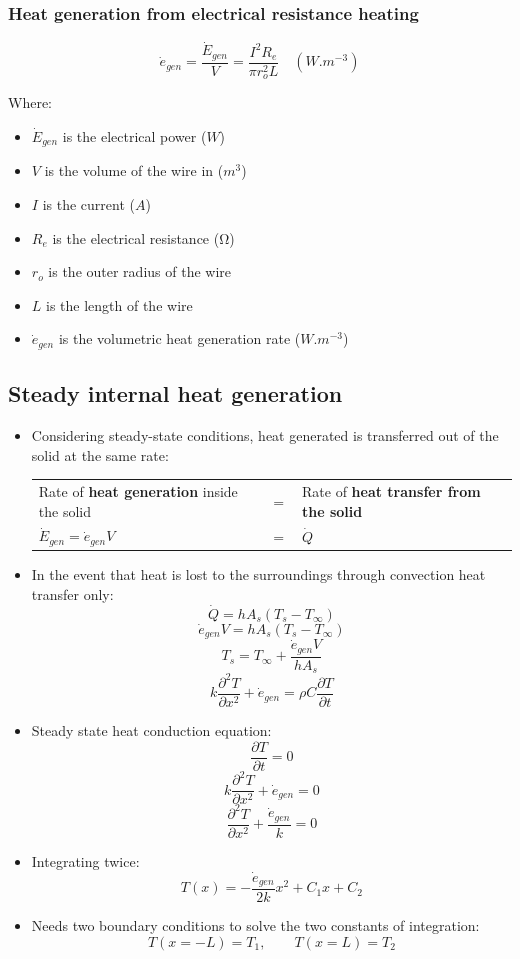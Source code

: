 \documentclass[11pt]{article}
\begin{document}
 \newpage
\subsubsection{Heat generation from electrical resistance heating}
\label{sec:org05d5d3d}
\[\dot{e}_{gen} = \frac{\dot{E}_{gen}}{V} = \frac{I^2 R_e}{\pi r_o^2 L} \quad (\unit{W.m^{-3}})\]

Where:
\begin{itemize}
\item \(\dot{E}_{gen}\) is the electrical power (\(\unit{W}\))
\item \(V\) is the volume of the wire in (\(\unit{m^3}\))
\item \(I\) is the current (\(\unit{A}\))
\item \(R_e\) is the electrical resistance (\(\unit{\ohm}\))
\item \(r_o\) is the outer radius of the wire
\item \(L\) is the length of the wire
\item \(\dot{e}_{gen}\) is the volumetric heat generation rate (\(\unit{W.m^{-3}}\))
\end{itemize}

 \newpage
\subsection{Steady internal heat generation}
\label{sec:orgba91224}
\begin{itemize}
\item Considering steady-state conditions, heat generated is transferred out of the solid at the same rate:
\begin{center}
\begin{tabular}{>{\centering\arraybackslash}m{12em} >{\centering\arraybackslash}m{1em} >{\centering\arraybackslash}m{12em}}
Rate of \textbf{heat generation} inside the solid & \(=\) & Rate of \textbf{heat transfer from the solid}\\
\(\dot{E}_{gen} = \dot{e}_{gen} V\) & \(=\) & \(\dot{Q}\)\\
\end{tabular}
\end{center}
\item In the event that heat is lost to the surroundings through convection heat transfer only:
\[\dot{Q} = h A_s (T_s - T_{\infty})\]
\[\dot{e}_{gen} V = h A_s (T_s - T_{\infty})\]
\[T_s = T_{\infty} + \frac{\dot{e}_{gen} V}{h A_s}\]
\[k \frac{\partial^2 T}{\partial x^2} + \dot{e}_{gen} = \rho C \frac{\partial T}{\partial t}\]
\item Steady state heat conduction equation:
\[\frac{\partial T}{\partial t} = 0\]
\[k \frac{\partial^2 T}{\partial x^2} + \dot{e}_{gen} = 0\]
\[\frac{\partial^2 T}{\partial x^2} + \frac{\dot{e}_{gen}}{k} = 0\]
\item Integrating twice:
\[T(x) = - \frac{\dot{e}_{gen}}{2k} x^2 + C_1 x + C_2\]
\item Needs two boundary conditions to solve the two constants of integration:
\[T(x = -L) = T_1, \qquad T(x = L) = T_2\]
\end{itemize}
\end{document}
